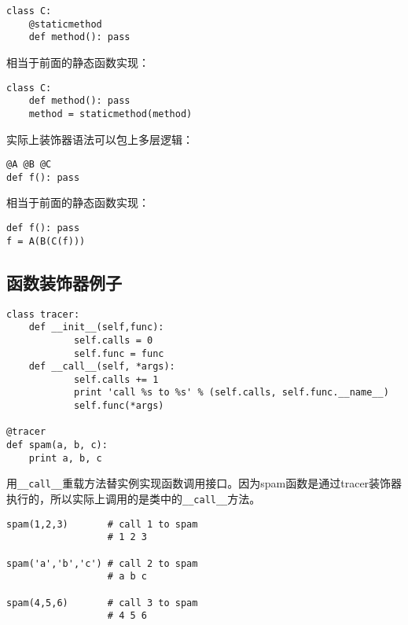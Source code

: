 \begin{lstlisting}
class C:
	@staticmethod
	def method(): pass
\end{lstlisting}

相当于前面的静态函数实现：

\begin{lstlisting}
class C:
	def method(): pass
	method = staticmethod(method)
\end{lstlisting}

实际上装饰器语法可以包上多层逻辑：

\begin{lstlisting}
@A @B @C
def f(): pass
\end{lstlisting}

相当于前面的静态函数实现：

\begin{lstlisting}
def f(): pass
f = A(B(C(f)))
\end{lstlisting}

\subsection{函数装饰器例子}

\begin{lstlisting}
class tracer:
    def __init__(self,func):
            self.calls = 0
            self.func = func
    def __call__(self, *args):
            self.calls += 1
            print 'call %s to %s' % (self.calls, self.func.__name__)
            self.func(*args)

@tracer
def spam(a, b, c):
    print a, b, c
\end{lstlisting}

用\verb|__call__|重载方法替实例实现函数调用接口。因为spam函数是通过tracer装饰器执行的，所以实际上调用的是类中的\verb|__call__|方法。

\begin{lstlisting}
spam(1,2,3)       # call 1 to spam
                  # 1 2 3

spam('a','b','c') # call 2 to spam
                  # a b c

spam(4,5,6)       # call 3 to spam
                  # 4 5 6
\end{lstlisting}

\begin{lstlisting}
\end{lstlisting}

\begin{lstlisting}
\end{lstlisting}

\begin{lstlisting}
\end{lstlisting}

\begin{lstlisting}
\end{lstlisting}


